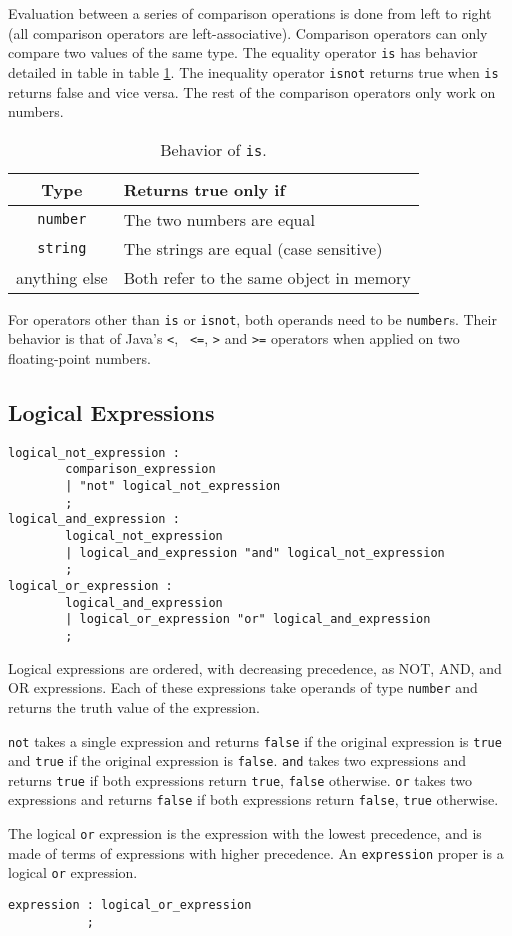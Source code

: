 Evaluation between a series of comparison operations is done from left
to right (all comparison operators are left-associative).  Comparison
operators can only compare two values of the same type.  The equality
operator \texttt{is} has behavior detailed in table in table
\ref{isbehavior}. The inequality operator \texttt{isnot} returns true
when \texttt{is} returns false and vice versa. The rest of the
comparison operators only work on numbers.

\begin{table}[htdp]
\begin{center}
\begin{tabular}{|c|p{8cm}|}
\hline
Type & Returns true only if\\
\hline
\texttt{number} & The two numbers are equal\\
\texttt{string} & The strings are equal (case sensitive)\\
anything else & Both refer to the same object in memory\\
\hline
\end{tabular}
\end{center}
\caption{Behavior of \texttt{is}.}\label{isbehavior}
\end{table}

For operators other than {\tt is} or {\tt isnot}, both operands need
to be {\tt number}s. Their behavior is that of Java's {\tt <}, {\tt
  <=}, {\tt >} and {\tt >=} operators when applied on two
floating-point numbers.

\subsection{Logical Expressions}
\begin{verbatim}
logical_not_expression : 
        comparison_expression
        | "not" logical_not_expression
        ;
logical_and_expression : 
        logical_not_expression
        | logical_and_expression "and" logical_not_expression
        ;
logical_or_expression : 
        logical_and_expression
        | logical_or_expression "or" logical_and_expression
        ;
\end{verbatim}

Logical expressions are ordered, with decreasing precedence, as NOT, AND, and OR expressions. Each of these expressions take operands of type \texttt{number} and returns the truth value of the expression.


\texttt{not} takes a single expression and returns \texttt{false} if the original expression is \texttt{true} and \texttt{true} if the original expression is \texttt{false}.
\texttt{and} takes two expressions and returns \texttt{true} if both expressions return \texttt{true}, \texttt{false} otherwise. \texttt{or} takes two expressions and returns \texttt{false} if both expressions return \texttt{false}, \texttt{true} otherwise.


The logical \texttt{or} expression is the expression with the lowest precedence, and is made of terms of expressions with higher precedence. An \texttt{expression} proper is a logical \texttt{or} expression.

\begin{verbatim}
expression : logical_or_expression
           ;
\end{verbatim}
